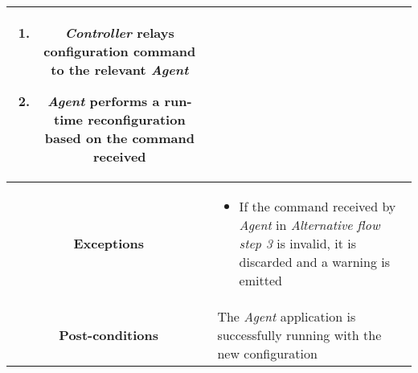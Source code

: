 \begin{longtable}{ |c|p{11.8cm}| }
{\begin{enumerate}
                        \item \textit{Controller} relays configuration command to the relevant \textit{Agent}
                        \item \textit{Agent} performs a run-time reconfiguration based on the command received
                    \end{enumerate}
                }\\ \hline
                \cellcolor[gray]{0.9} \textbf{Exceptions} & 
                    \begin{itemize}
                        \item If the command received by \textit{Agent} in \textit{Alternative flow step 3} is invalid, it is discarded and a warning is emitted 
                    \end{itemize}\\ \hline
                \cellcolor[gray]{0.9} \textbf{Post-conditions} & The \textit{Agent} application is successfully running with the new configuration\\ \hline
            \end{longtable}

